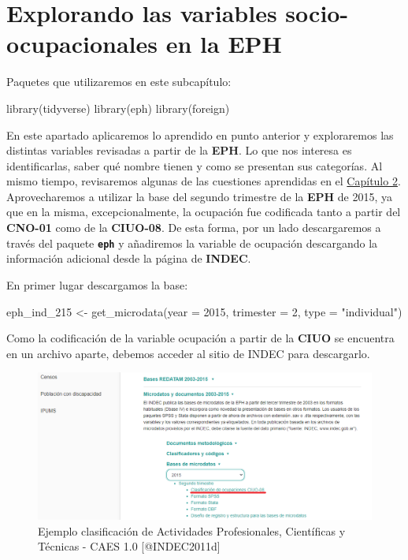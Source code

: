 \documentclass[
]{book}
\newenvironment{Shaded}{\begin{snugshade}}{\end{snugshade}}
\newcommand{\AttributeTok}[1]{\textcolor[rgb]{0.77,0.63,0.00}{#1}}
\newcommand{\DecValTok}[1]{\textcolor[rgb]{0.00,0.00,0.81}{#1}}
\newcommand{\FunctionTok}[1]{\textcolor[rgb]{0.00,0.00,0.00}{#1}}
\newcommand{\NormalTok}[1]{#1}
\newcommand{\OtherTok}[1]{\textcolor[rgb]{0.56,0.35,0.01}{#1}}
\newcommand{\StringTok}[1]{\textcolor[rgb]{0.31,0.60,0.02}{#1}}
\begin{document}
\hypertarget{eph4}{%
\section{Explorando las variables socio-ocupacionales en la EPH}\label{eph4}}

Paquetes que utilizaremos en este subcapítulo:

\begin{Shaded}
\begin{Highlighting}[]
\FunctionTok{library}\NormalTok{(tidyverse)}
\FunctionTok{library}\NormalTok{(eph)}
\FunctionTok{library}\NormalTok{(foreign)}
\end{Highlighting}
\end{Shaded}

En este apartado aplicaremos lo aprendido en punto anterior y exploraremos las distintas variables revisadas a partir de la \textbf{EPH}. Lo que nos interesa es identificarlas, saber qué nombre tienen y como se presentan sus categorías. Al mismo tiempo, revisaremos algunas de las cuestiones aprendidas en el \protect\hyperlink{fuentes}{Capítulo 2}. Aprovecharemos a utilizar la base del segundo trimestre de la \textbf{EPH} de 2015, ya que en la misma, excepcionalmente, la ocupación fue codificada tanto a partir del \textbf{CNO-01} como de la \textbf{CIUO-08}. De esta forma, por un lado descargaremos a través del paquete \textbf{\texttt{eph}} y añadiremos la variable de ocupación descargando la información adicional desde la página de \textbf{INDEC}.

En primer lugar descargamos la base:

\begin{Shaded}
\begin{Highlighting}[]
\NormalTok{eph\_ind\_215 }\OtherTok{\textless{}{-}} \FunctionTok{get\_microdata}\NormalTok{(}\AttributeTok{year =} \DecValTok{2015}\NormalTok{, }\AttributeTok{trimester =} \DecValTok{2}\NormalTok{, }\AttributeTok{type =} \StringTok{"individual"}\NormalTok{)}
\end{Highlighting}
\end{Shaded}

Como la codificación de la variable ocupación a partir de la \textbf{CIUO} se encuentra en un archivo aparte, debemos acceder al sitio de INDEC para descargarlo.

\begin{figure}

{\centering \includegraphics[width=0.8\linewidth]{imagenes/indec_ciuo} 

}

\caption{Ejemplo clasificación de Actividades Profesionales, Científicas y Técnicas - CAES 1.0 [@INDEC2011d]}\label{fig:unnamed-chunk-40}
\end{figure}
\end{document}
